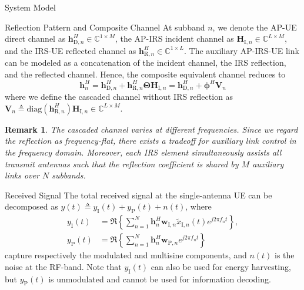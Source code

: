 \documentclass[journal]{IEEEtran}
\newtheorem{remark}{Remark}
\begin{document}
\begin{section}{System Model}
\begin{subsection}{Reflection Pattern and Composite Channel}
			At subband $n$, we denote the AP-UE direct channel as $\boldsymbol{h}_{\mathrm{D},n}^H \in \mathbb{C}^{1 \times M}$, the AP-IRS incident channel as $\boldsymbol{H}_{\mathrm{I},n} \in \mathbb{C}^{L \times M}$, and the IRS-UE reflected channel as $\boldsymbol{h}_{\mathrm{R},n}^H \in \mathbb{C}^{1 \times L}$. The auxiliary AP-IRS-UE link can be modeled as a concatenation of the incident channel, the IRS reflection, and the reflected channel. Hence, the composite equivalent channel reduces to
			\begin{equation}\label{eq:h_n}
				\boldsymbol{h}_{n}^H = \boldsymbol{h}_{\mathrm{D},n}^H + \boldsymbol{h}_{\mathrm{R},n}^H \boldsymbol{\Theta} \boldsymbol{H}_{\mathrm{I},n} = \boldsymbol{h}_{\mathrm{D},n}^H + \boldsymbol{\phi}^H \boldsymbol{V}_{n}
			\end{equation}
			where we define the cascaded channel without IRS reflection as $\boldsymbol{V}_{n} \triangleq \mathrm{diag}(\boldsymbol{h}_{\mathrm{R},n}^H)\boldsymbol{H}_{\mathrm{I},n} \in \mathbb{C}^{L \times M}$.

			\begin{remark}\label{re:subband_tradeoff}
				The cascaded channel varies at different frequencies. Since we regard the reflection as frequency-flat, there exists a tradeoff for auxiliary link control in the frequency domain. Moreover, each IRS element simultaneously assists all transmit antennas such that the reflection coefficient is shared by $M$ auxiliary links over $N$ subbands.
			\end{remark}
		\end{subsection}


		\begin{subsection}{Received Signal}
			The total received signal at the single-antenna UE can be decomposed as $y(t) \triangleq y_{\mathrm{I}}(t)+y_\mathrm{P}(t)+n(t)$, where
			\begin{align}
				y_{\mathrm{I}}(t) & = \Re\left\{\sum_{n=1}^N{\boldsymbol{h}_{n}^H}{\boldsymbol{w}_{\mathrm{I},n}\tilde{x}_{\mathrm{I},n}(t)}{e^{j2{\pi}{f_n}{t}}}\right\},\label{eq:y_I}\\
				y_{\mathrm{P}}(t) & = \Re\left\{\sum_{n=1}^N{\boldsymbol{h}_{n}^H}\boldsymbol{w}_{\mathrm{P},n}{e^{j2{\pi}{f_n}{t}}}\right\}\label{eq:y_P}
			\end{align}
			capture respectively the modulated and multisine components, and $n(t)$ is the noise at the RF-band. Note that $y_{\mathrm{I}}(t)$ can also be used for energy harvesting, but $y_{\mathrm{P}}(t)$ is unmodulated and cannot be used for information decoding.
		\end{subsection}



\end{section}
\end{document}
